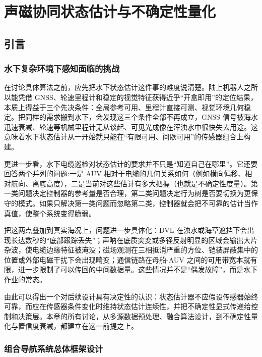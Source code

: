 
\chapter{声磁协同状态估计与不确定性量化}

\section{引言}\label{sec:ch03-3-1}

\subsection{水下复杂环境下感知面临的挑战}\label{sec:ch03-3-1-1}

在讨论具体算法之前，应先把水下状态估计这件事的难度说清楚。陆上机器人之所以能凭借 GNSS、轮速里程计和稳定的视觉特征获得近乎``开盒即用''的定位结果，本质上得益于三个先决条件：全局参考可用、里程计直接可测、视觉环境几何稳定。把同样的需求搬到水下，会发现这三个条件全部不再成立，GNSS 信号被海水迅速衰减、轮速等机械里程计无从谈起、可见光成像在浑浊水中很快失去用途。这意味着水下状态估计从一开始就只能在``有限可用、间歇可用''的传感器组合上构建。

更进一步看，水下电缆巡检对状态估计的要求并不只是``知道自己在哪里''。它还要回答两个并列的问题:一是 AUV 相对于电缆的几何关系如何（例如横向偏移、相对航向、离底高度），二是当前对这些估计有多大把握（也就是不确定性度量）。第一类问题决定控制器的参考量是否合理，第二类问题决定行为树是否要切换为更保守的模式。如果只解决第一类问题而忽略第二类，控制器就会把不可靠的估计当作真值，使整个系统变得脆弱。

把这两点叠加到真实海况上，问题进一步具体化：DVL 在浊水或海草遮挡下会出现长达数秒的``底部跟踪丢失''；声呐在底质突变或多径反射明显的区域会输出大片杂波，使电缆边缘特征被淹没；磁场观测在三相抵消严重的方位、铠装屏蔽集中的位置或外部电磁干扰下会出现畸变；通信链路在母船-AUV 之间的可用带宽本就有限，进一步限制了可以传回的中间数据量。这些情况并不是``偶发故障''，而是水下作业的常态。

由此可以得出一个对后续设计具有决定性的认识：状态估计器不应假设传感器始终可靠，而应在传感器条件变化时维持状态估计连续性，并把不确定性显式传递给控制和决策层。本章的所有讨论，从多源数据预处理、融合算法设计，到不确定性量化与置信度衰减，都建立在这一前提之上。

\subsection{组合导航系统总体框架设计}\label{sec:ch03-3-1-2}

